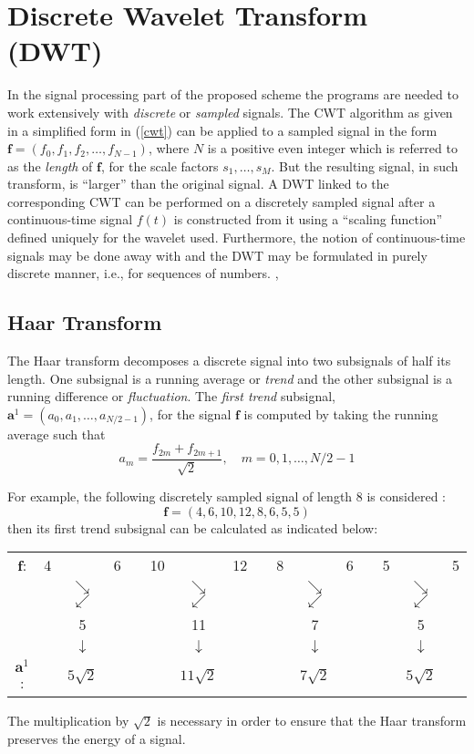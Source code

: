 \documentclass[a4paper,11pt]{article}
\begin{document}
\section{Discrete Wavelet Transform (DWT)}
In the signal processing part of the proposed scheme the programs are needed to work extensively with \emph{discrete} or \emph{sampled} signals. The CWT algorithm as given in a simplified form in (\ref{cwt}) can be applied to a sampled signal in the form $\mathbf{f} = (f_{0},f_{1},f_{2},\ldots,f_{N-1})$, where $N$ is a positive even integer which is referred to as the \emph{length} of $\mathbf{f}$, for the scale factors $s_{1},\ldots,s_{M}$. But the resulting signal, in such transform, is ``larger'' than the original signal. A DWT linked to the corresponding CWT can be performed on a discretely sampled signal after a continuous-time signal $f(t)$ is constructed from it using a ``scaling function'' defined uniquely for the wavelet used. Furthermore, the notion of continuous-time signals may be done away with and the DWT may be formulated in purely discrete manner, i.e., for sequences of numbers. \cite{daub},\cite{stark}

\subsection{Haar Transform} \label{ht}
The Haar transform decomposes a discrete signal into two subsignals of half its length. One subsignal is a running average or \emph{trend} and the other subsignal is a running difference or \emph{fluctuation}. The \emph{first trend} subsignal, $\mathbf{a}^{1} = (a_{0},a_{1},\ldots,a_{N/2-1})$, for the signal $\mathbf{f}$ is computed by taking the running average such that 
\begin{equation} \label{am}
a_{m} = \frac{f_{2m}+f_{2m+1}}{\sqrt{2}}, \quad m=0,1,\ldots,N/2-1
\end{equation}

For example, the following discretely sampled signal of length 8 is considered \cite{walker}:
\begin{displaymath}
\mathbf{f} = (4,6,10,12,8,6,5,5)
\end{displaymath}
then its first trend subsignal can be calculated as indicated below:
\begin{center}
\begin{tabular}{cccccccccccccccc}
$\mathbf{f}$: & 4 & & 6 & & 10 & & 12 & & 8 & & 6 & & 5 & & 5 \\
 &   & $\searrow$$\swarrow$ & & & & $\searrow$$\swarrow$ & & & & $\searrow$$\swarrow$ & & & & $\searrow$$\swarrow$ &  \\
 &   & 5 & & & & 11 & & & & 7 & & & & 5 &   \\
 &   & $\downarrow$ & & & & $\downarrow$ & & & & $\downarrow$ & & & & $\downarrow$ &  \\
$\mathbf{a}^{1}$: & & $5\sqrt{2}$ & & & & $11\sqrt{2}$ & & & & $7\sqrt{2}$ & & & & $5\sqrt{2}$ &   
\end{tabular}
\end{center}
The multiplication by $\sqrt{2}$ is necessary in order to ensure that the Haar transform preserves the energy of a signal.
\end{document}
